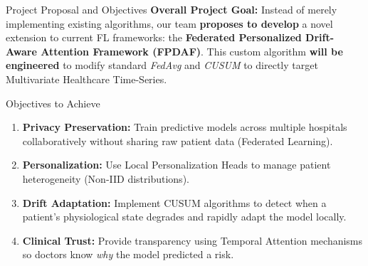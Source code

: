 \documentclass[aspectratio=169, 11pt]{beamer}
\begin{document}
\begin{frame}{Project Proposal and Objectives}
    \textbf{Overall Project Goal:}
    Instead of merely implementing existing algorithms, our team \textbf{proposes to develop} a novel extension to current FL frameworks: the \textbf{Federated Personalized Drift-Aware Attention Framework (FPDAF)}. This custom algorithm \textbf{will be engineered} to modify standard \textit{FedAvg} and \textit{CUSUM} to directly target Multivariate Healthcare Time-Series.

    \vspace{0.3cm}
    \begin{block}{Objectives to Achieve}
        \begin{enumerate}
            \item \textbf{Privacy Preservation:} Train predictive models across multiple hospitals collaboratively without sharing raw patient data (Federated Learning).
            \item \textbf{Personalization:} Use Local Personalization Heads to manage patient heterogeneity (Non-IID distributions).
            \item \textbf{Drift Adaptation:} Implement CUSUM algorithms to detect when a patient's physiological state degrades and rapidly adapt the model locally.
            \item \textbf{Clinical Trust:} Provide transparency using Temporal Attention mechanisms so doctors know \textit{why} the model predicted a risk.
        \end{enumerate}
    \end{block}
\end{frame}
\end{document}

